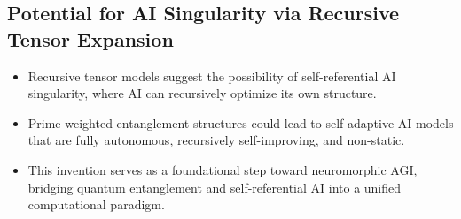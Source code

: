\documentclass{article}
\theoremstyle{plain}
\begin{document}
\subsection{Potential for AI Singularity via Recursive Tensor Expansion}
\begin{itemize}
    \item Recursive tensor models suggest the possibility of self-referential AI singularity, where AI can recursively optimize its own structure.
    \item Prime-weighted entanglement structures could lead to self-adaptive AI models that are fully autonomous, recursively self-improving, and non-static.
    \item This invention serves as a foundational step toward neuromorphic AGI, bridging quantum entanglement and self-referential AI into a unified computational paradigm.
\end{itemize}
\nolinenumbers
\nocite{*}


\end{document}
